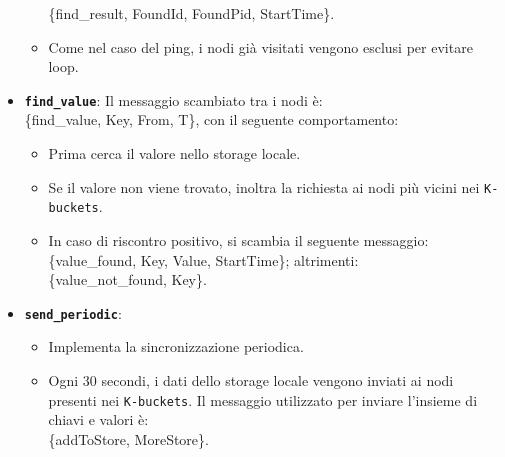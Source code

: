 \documentclass{article}
\begin{document}
\begin{itemize}
\begin{itemize}
        \{find\_result, FoundId, FoundPid, StartTime\}.
        \item Come nel caso del ping, i nodi già visitati vengono esclusi per evitare loop.
    \end{itemize}
    \item \textbf{\texttt{find\_value}}:  
    Il messaggio scambiato tra i nodi è:\\
    \{find\_value, Key, From, T\}, con il seguente comportamento:
    \begin{itemize}
        \item Prima cerca il valore nello storage locale.
        \item Se il valore non viene trovato, inoltra la richiesta ai nodi più vicini nei \texttt{K-buckets}.
        \item In caso di riscontro positivo, si scambia il seguente messaggio:\\
        \{value\_found, Key, Value, StartTime\}; altrimenti:\\
        \{value\_not\_found, Key\}.
    \end{itemize}
    \item \textbf{\texttt{send\_periodic}}:
    \begin{itemize}
        \item Implementa la sincronizzazione periodica.
        \item Ogni 30 secondi, i dati dello storage locale vengono inviati ai nodi presenti nei \texttt{K-buckets}. Il messaggio utilizzato per inviare l'insieme di chiavi e valori è:\\
        \{addToStore, MoreStore\}.
    \end{itemize}
\end{itemize}
\end{document}
